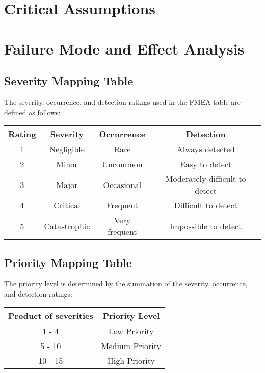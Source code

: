 \documentclass{article}
\begin{document}
\section{Critical Assumptions}


\section{Failure Mode and Effect Analysis}

\subsection{Severity Mapping Table}
The severity, occurrence, and detection ratings used in the FMEA table are defined as follows:
\begin{table}[H]
\begin{tabular}{c|c|c|c}

    Rating & Severity & Occurrence & Detection \\\hline
    1 & Negligible & Rare & Always detected \\\hline
    2 & Minor & Uncommon & Easy to detect \\ \hline
    3 & Major & Occasional & Moderately difficult to detect \\\hline
    4 & Critical & Frequent & Difficult to detect \\\hline
    5 & Catastrophic & Very frequent & Impossible to detect \\


\end{tabular}
\end{table}

\subsection{Priority Mapping Table}

The priority level is determined by the summation of the severity, occurrence,
and detection ratings:

\begin{table}[H]
    \begin{tabular}{c|c}
        Product of severities & Priority Level \\\hline
        1 - 4 & Low Priority \\\hline
        5 - 10 & Medium Priority \\\hline
        10 - 15 & High Priority \\

    \end{tabular}
\end{table}
\end{document}
